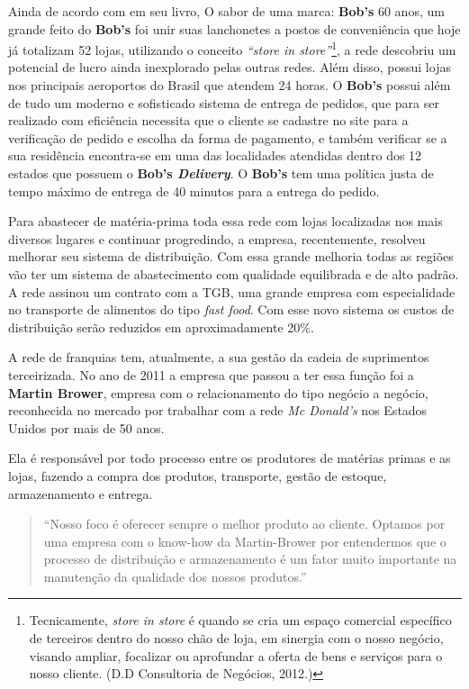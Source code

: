 		Ainda de acordo com \cite{lamonica} em seu livro, O sabor de uma marca: \textbf{Bob’s} 60 anos, um grande feito do \textbf{Bob’s} foi unir suas lanchonetes a postos de conveniência que hoje já totalizam 52 lojas, utilizando o conceito \emph{“store in store”}\footnote{Tecnicamente, \emph{store in store} é quando se cria um espaço comercial específico de terceiros dentro do nosso chão de loja, em sinergia com o nosso negócio, visando ampliar, focalizar ou aprofundar a oferta de bens e serviços para o nosso cliente. (D.D Consultoria de Negócios, 2012.)}, a rede descobriu um potencial de lucro ainda inexplorado pelas outras redes. Além disso, possui lojas nos principais aeroportos do Brasil que atendem 24 horas. O \textbf{Bob’s} possui além de tudo um moderno e sofisticado sistema de entrega de pedidos, que para ser realizado com eficiência necessita que o cliente se cadastre no site para a verificação de pedido e escolha da forma de pagamento, e também verificar se a sua residência encontra-se em uma das localidades atendidas dentro dos 12 estados que possuem o \textbf{Bob’s \emph{Delivery}}. O \textbf{Bob’s} tem uma política justa de tempo máximo de entrega de 40 minutos para a entrega do pedido.

		Para abastecer de matéria-prima toda essa rede com lojas localizadas nos mais diversos lugares e continuar progredindo, a empresa, recentemente, resolveu melhorar seu sistema de distribuição. Com essa grande melhoria todas as regiões vão ter um sistema de abastecimento com qualidade equilibrada e de alto padrão.  A rede assinou um contrato com a TGB, uma grande empresa com especialidade no transporte de alimentos do tipo \emph{fast food}. Com esse novo sistema os custos de distribuição serão reduzidos em aproximadamente 20\%.

		A rede de franquias tem, atualmente, a sua gestão da cadeia de suprimentos terceirizada. No ano de 2011 a empresa que passou a ter essa função foi a \textbf{Martin Brower}, empresa com o relacionamento do tipo negócio a negócio, reconhecida no mercado por trabalhar com a rede \emph{Mc Donald’s} nos Estados Unidos por mais de 50 anos.

		Ela é responsável por todo processo entre os produtores de matérias primas e as lojas, fazendo a compra dos produtos, transporte, gestão de estoque, armazenamento e entrega.

		\begin{quotation}
			“Nosso foco é oferecer sempre o melhor produto ao cliente. Optamos por uma empresa com o know-how da Martin-Brower por entendermos que o processo de distribuição e armazenamento é um fator muito importante na manutenção da qualidade dos nossos produtos.” \cite{detsi}
		\end{quotation}
		
